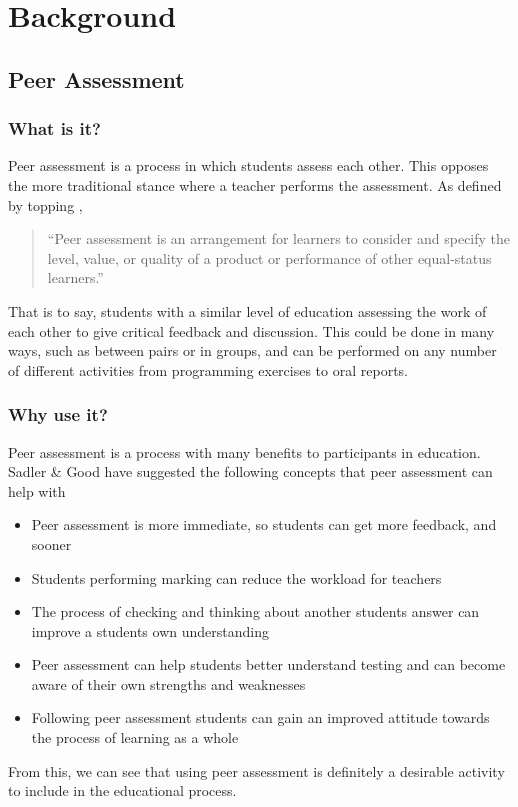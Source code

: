 \documentclass[a4paper,11pt]{report}
\begin{document}
\chapter{Background}
\section{Peer Assessment}
\subsection{What is it?}
Peer assessment is a process in which students assess each other. This opposes the more traditional stance where a teacher performs the assessment. As defined by topping \cite{topping_peer_2009},
\begin{quote}
``Peer assessment is an arrangement for learners to consider and specify the level, value, or quality of a product or performance of other equal-status learners.''
\end{quote}
That is to say, students with a similar level of education assessing the work of each other to give critical feedback and discussion. This could be done in many ways, such as between pairs or in groups, and can be performed on any number of different activities from programming exercises to oral reports.


\subsection{Why use it?}
Peer assessment is a process with many benefits to participants in education. Sadler \& Good \cite{sadler_impact_2006} have suggested the following concepts that peer assessment can help with
\begin{itemize}
 \item Peer assessment is more immediate, so students can get more feedback, and sooner
 \item Students performing marking can reduce the workload for teachers
 \item The process of checking and thinking about another students answer can improve a students own understanding
 \item Peer assessment can help students better understand testing and can become aware of their own strengths and weaknesses
 \item Following peer assessment students can gain an improved attitude towards the process of learning as a whole
\end{itemize}
From this, we can see that using peer assessment is definitely a desirable activity to include in the educational process.\par
\end{document}
